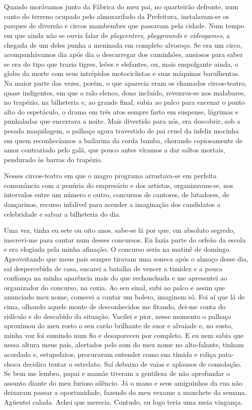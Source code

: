 \chapter{}
Quando morávamos junto da Fábrica do meu pai, no quarteirão defronte, num canto do terreno ocupado pelo almoxarifado da Prefeitura, instalavam-se os parques de diversão e circos mambembes que passavam pela cidade.
Num tempo em que ainda não se ouvia falar de \textit{playcenters}, \textit{playgrounds} e \textit{videogames}, a chegada de um deles punha a meninada em completo alvoroço.
Se era um circo, acompanhávamos dia após dia o descarregar dos caminhões, ansiosos para saber se era do tipo que trazia tigres, leões e elefantes, ou, mais empolgante ainda, o globo da morte com seus intrépidos motociclistas e suas máquinas barulhentas.
Na maior parte das vezes, porém, o que aparecia eram os chamados circos-teatro, quase indigentes, em que o ralo elenco, dono incluído, revezava-se nos malabares, no trapézio, na bilheteria e, ao grande final, subia ao palco para encenar o ponto alto do espetáculo, o drama em três atos sempre farto em suspense, lágrimas e punhaladas que encerrava a noite.
Mais divertido para nós, era descobrir, sob a pesada maquilagem, o palhaço agora travestido de pai cruel da infeliz mocinha em quem reconhecíamos a bailarina da corda bamba, chorando copiosamente de amor contrariado pelo galã, que pouco antes víramos a dar saltos mortais, pendurado às barras do trapézio.

Nesses circos-teatro em que o magro programa arrastava-se em perfeita consonância com a penúria do empresário e dos artistas, organizavam-se, nos intervalos entre um número e outro, concursos de cantores, de lutadores, de dançarinos, recurso infalível para acender a imaginação dos candidatos a celebridade e salvar a bilheteria do dia.


Uma vez, tinha eu sete ou oito anos, sabe-se lá por que, em absoluto segredo, inscrevi-me para cantar num desses concursos.
Eu fazia parte do orfeão da escola e era elogiada pela minha afinação.
O concurso seria na matinê de domingo.
Aproveitando que meus pais sempre tiravam uma soneca após o almoço desse dia, saí despercebida de casa, encarei a batalha de vencer a timidez e a pouca confiança na minha aparência mais do que rechonchuda e me apresentei ao organizador do concurso, na coxia.
Ao seu sinal, subi ao palco e assim que anunciado meu nome, comecei a cantar um bolero, imaginem só.
Foi aí que lá de cima, olhando aquele monte de desconhecidos me fitando, dei-me conta do ridículo e do descabido da situação.
Vacilei e pior, nesse momento o palhaço aproximou do meu rosto o seu carão brilhante de suor e alvaiade e, no susto, minha voz foi sumindo num fio e desapareceu por completo.
E eu nem sabia que nessa altura meus pais, alertados pelo som do meu nome no alto-falante, tinham acordado e, estupefatos, procuravam entender como sua tímida e roliça pata-choca decidira tentar o estrelato.
Saí debaixo de vaias e aplausos de consolação.
Se bem me lembro, papai e mamãe tiveram a gentileza de não aprofundar o assunto diante do meu furioso silêncio.
Já o mano e seus amiguinhos da rua não deixaram passar a oportunidade, fazendo do meu vexame a manchete da semana.
Agüentei calada.
Achei que merecia.
 Contudo, eu logo teria uma meia vingança.


